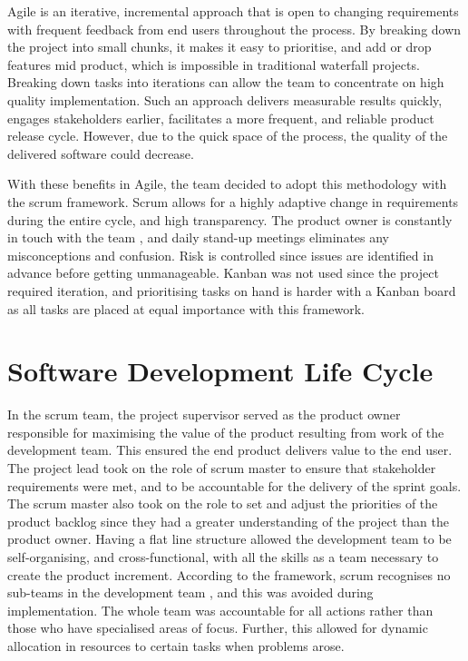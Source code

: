 Agile is an iterative, incremental approach that is open to changing requirements with frequent feedback from end users throughout the process. By breaking down the project into small chunks, it makes it easy to prioritise, and add or drop features mid product, which is impossible in traditional waterfall projects. Breaking down tasks into iterations can allow the team to concentrate on high quality implementation. Such an approach delivers measurable results quickly, engages stakeholders earlier, facilitates a more frequent, and reliable product release cycle. However, due to the quick space of the process, the quality of the delivered software could decrease.

With these benefits in Agile, the team decided to adopt this methodology with the scrum framework. Scrum allows for a highly adaptive change in requirements during the entire cycle, and high transparency. The product owner is constantly in touch with the team \cite{globalluxsoft}, and daily stand-up meetings eliminates any misconceptions and confusion. Risk is controlled since issues are identified in advance before getting unmanageable. Kanban was not used since the project required iteration, and prioritising tasks on hand is harder with a Kanban board as all tasks are placed at equal importance with this framework.

\section{Software Development Life Cycle}
In the scrum team, the project supervisor served as the product owner responsible for maximising the value of the product resulting from work of the development team. This ensured the end product delivers value to the end user. The project lead took on the role of scrum master to ensure that stakeholder requirements were met, and to be accountable for the delivery of the sprint goals. The scrum master also took on the role to set and adjust the priorities of the product backlog since they had a greater understanding of the project than the product owner. Having a flat line structure allowed the development team to be self-organising, and cross-functional, with all the skills as a team necessary to create the product increment. According to the framework, scrum recognises no sub-teams in the development team \cite{schwaber}, and this was avoided during implementation. The whole team was accountable for all actions rather than those who have specialised areas of focus. Further, this allowed for dynamic allocation in resources to certain tasks when problems arose.

